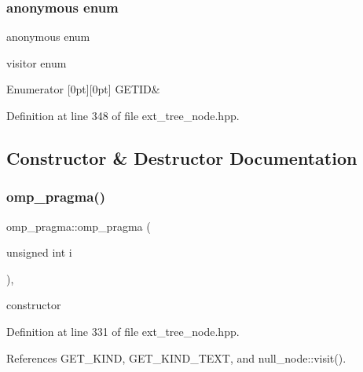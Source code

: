 \subsubsection{\texorpdfstring{anonymous enum}{anonymous enum}}
{\footnotesize\ttfamily anonymous enum}



visitor enum 

\begin{DoxyEnumFields}{Enumerator}
[0pt][0pt]{}\mbox{\label{structomp__pragma_a3fbb1385b0295fc90deb053c4b16d25dafcb2946bdf8413b13ae45ee21d4d7d14}} 
G\+E\+T\+ID&\\
\hline

\end{DoxyEnumFields}


Definition at line 348 of file ext\+\_\+tree\+\_\+node.\+hpp.



\subsection{Constructor \& Destructor Documentation}
\mbox{\label{structomp__pragma_a43c08202d68336c34f270657d5ee0207}} 
\subsubsection{\texorpdfstring{omp\+\_\+pragma()}{omp\_pragma()}}
{\footnotesize\ttfamily omp\+\_\+pragma\+::omp\+\_\+pragma (\begin{DoxyParamCaption}\item[{unsigned int}]{i }\end{DoxyParamCaption})\hspace{0.3cm}{\ttfamily [inline]}, {\ttfamily [explicit]}}



constructor 



Definition at line 331 of file ext\+\_\+tree\+\_\+node.\+hpp.



References G\+E\+T\+\_\+\+K\+I\+ND, G\+E\+T\+\_\+\+K\+I\+N\+D\+\_\+\+T\+E\+XT, and null\+\_\+node\+::visit().

